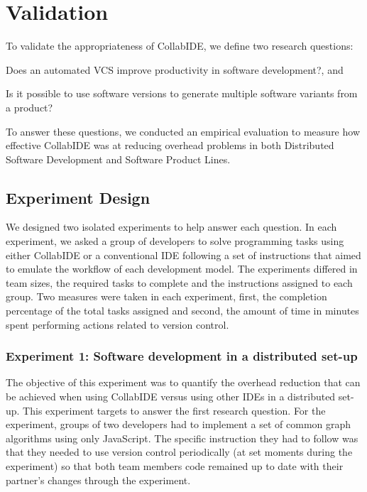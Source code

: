 

\section{Validation}
\label{sec:validation}

To validate the appropriateness of CollabIDE, we define two research questions:
\begin{enumerate*}[label=(\arabic*)]
\item Does an automated \ac{VCS} improve productivity in software development?, and
\item Is it possible to use software versions to generate multiple software variants from a product?
\end{enumerate*} 
To answer these questions, we conducted an empirical evaluation 
to measure how effective CollabIDE was at reducing overhead problems 
in both Distributed Software Development and Software Product Lines.

\subsection{Experiment Design}

We designed two isolated experiments to help answer each question. In each experiment, we asked 
a group of developers to solve programming tasks using either CollabIDE or a 
conventional IDE following a set of instructions that aimed to emulate the workflow of each 
development model. The experiments differed in team sizes, the required tasks to complete and the 
instructions assigned to each group. Two measures were taken in each experiment, first, the 
completion percentage of the total tasks assigned and second, the amount of time in minutes spent 
performing actions related to version control. 

\subsubsection{Experiment 1: Software development in a distributed set-up}
The objective of this experiment was to quantify the overhead reduction that can be achieved when 
using CollabIDE versus using other IDEs in a distributed set-up. This experiment targets to answer the 
first research question. For the experiment, groups of two developers had to implement a set of 
common graph algorithms using only JavaScript. The specific instruction they had to follow was that 
they needed to use version control periodically (at set moments during the experiment) so that both 
team members code remained up to date with their partner's changes through the experiment. 


